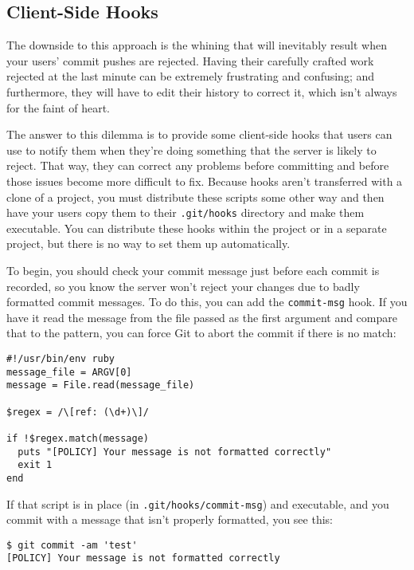 \documentclass[a4paper]{book}
\newcounter{tab}[chapter]
\begin{document}
\subsection{Client-Side Hooks}\label{client-side-hooks-1}

The downside to this approach is the whining that will inevitably result when your users' commit pushes are rejected. Having their carefully crafted work rejected at the last minute can be extremely frustrating and confusing; and furthermore, they will have to edit their history to correct it, which isn't always for the faint of heart.

The answer to this dilemma is to provide some client-side hooks that users can use to notify them when they're doing something that the server is likely to reject. That way, they can correct any problems before committing and before those issues become more difficult to fix. Because hooks aren't transferred with a clone of a project, you must distribute these scripts some other way and then have your users copy them to their \texttt{.git/hooks} directory and make them executable. You can distribute these hooks within the project or in a separate project, but there is no way to set them up automatically.

To begin, you should check your commit message just before each commit is recorded, so you know the server won't reject your changes due to badly formatted commit messages. To do this, you can add the \texttt{commit-msg} hook. If you have it read the message from the file passed as the first argument and compare that to the pattern, you can force Git to abort the commit if there is no match:

\begin{shaded}\begin{verbatim}
#!/usr/bin/env ruby
message_file = ARGV[0]
message = File.read(message_file)

$regex = /\[ref: (\d+)\]/

if !$regex.match(message)
  puts "[POLICY] Your message is not formatted correctly"
  exit 1
end
\end{verbatim}\end{shaded}

If that script is in place (in \texttt{.git/hooks/commit-msg}) and executable, and you commit with a message that isn't properly formatted, you see this:

\begin{shaded}\begin{verbatim}
$ git commit -am 'test'
[POLICY] Your message is not formatted correctly
\end{verbatim}\end{shaded}
\end{document}
